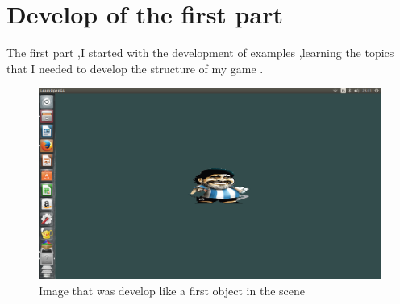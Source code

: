 \documentclass[10pt,conference]{IEEEtran}
\begin{document}
\section{Develop of the first part}
    The first part ,I started with the development of  examples
    ,learning the topics that I needed to develop the structure of my game .
\begin{figure}[h!]
\centering
\includegraphics[scale=0.14]{implementacion.png}
\caption{  Image that was develop like a first object in the scene }
\label{fig:Object player}
\end{figure}
    
\end{document}
